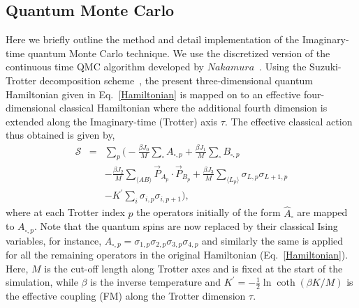 \subsection{Quantum Monte Carlo}
\label{method}
Here we briefly outline the method and detail implementation  of the Imaginary-time quantum Monte Carlo technique. We use the discretized version of the continuous time QMC algorithm developed by $Nakamura$~\cite{nakamura2008efficient}. Using the Suzuki-Trotter decomposition scheme~\cite{SUZUKI1993232}, the present three-dimensional quantum Hamiltonian given in Eq.~\eqref{Hamiltonian} is mapped on to an effective four-dimensional classical Hamiltonian where the additional fourth dimension is extended along the Imaginary-time (Trotter) axis $\tau$.  The effective classical action thus obtained is given by,
\begin{eqnarray}
\label{action}
\mathcal{S} &=& \sum_{p}\bigg(-\frac{\beta J_0}{M}\sum_{\square} A_{\square,p} + \frac{\beta J_1}{M}\sum_{\square}B_{\square,p} \nonumber \\
&& - \frac{\beta J_2}{M}\sum_{\langle AB \rangle}\vec{P}_{A_p}\cdot\vec{P}_{B_p} + \frac{\beta J_3}{M}\sum_{\langle L_p\rangle}\sigma_{L,p}\sigma_{L+1,p} \nonumber  \\
&& - K^{\prime}\sum_{i}\sigma_{i,p}\sigma_{i,p+1} \bigg),
\end{eqnarray}
where at each Trotter index $p$ the operators initially of the form $\hat{A}_{\square}$ are mapped to $A_{\square,p}$. Note that the quantum spins are now replaced by their classical Ising variables, for instance,  $A_{\square,p}=\sigma_{1,p}\sigma_{2,p}\sigma_{3,p}\sigma_{4,p}$ and similarly the same is applied for all the remaining operators in the original Hamiltonian (Eq.~\eqref{Hamiltonian}). Here, $M$ is the cut-off length along Trotter axes and is fixed at the start of the simulation, while $\beta$ is the inverse temperature and $K^{\prime}=-\frac{1}{2}\ln \coth(\beta K/M)$ is the effective coupling (FM) along the Trotter dimension $\tau$.\\%
